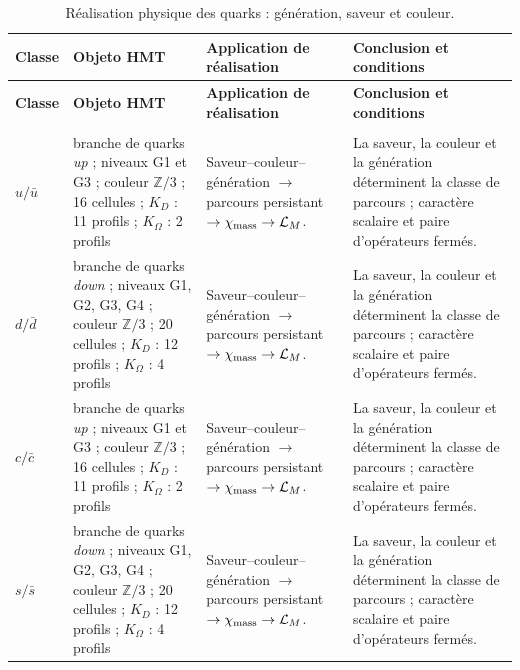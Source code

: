 \begingroup
\setlength{\tabcolsep}{4.5pt}
\renewcommand{\arraystretch}{1.28}
\begin{longtable}{@{}>{\raggedright\arraybackslash}p{}>{\raggedright\arraybackslash}p{}>{\raggedright\arraybackslash}p{}>{\raggedright\arraybackslash}p{}@{}}
\caption{Réalisation physique des quarks : génération, saveur et couleur.}\label{tab:masas-realizacion-quarks}\\
\toprule
\textbf{Classe} & \textbf{Objeto HMT} & \textbf{Application de réalisation} & \textbf{Conclusion et conditions} \\
\midrule
\endfirsthead
\toprule
\textbf{Classe} & \textbf{Objeto HMT} & \textbf{Application de réalisation} & \textbf{Conclusion et conditions} \\
\midrule
\endhead
\midrule
\multicolumn{4}{r}{\footnotesize Suite à la page suivante.}\\
\endfoot
\bottomrule
\endlastfoot
$u/\bar u$ & branche de quarks \emph{up} ; niveaux G1 et G3 ; couleur $\mathbb Z/3$ ; 16 cellules ; $K_D$ : 11 profils ; $K_\Omega$ : 2 profils & Saveur--couleur--génération $\to$ parcours persistant $\to\chi_{\rm mass}\to\mathcal L_M$. & La saveur, la couleur et la génération déterminent la classe de parcours ; caractère scalaire et paire d’opérateurs fermés. \\
$d/\bar d$ & branche de quarks \emph{down} ; niveaux G1, G2, G3, G4 ; couleur $\mathbb Z/3$ ; 20 cellules ; $K_D$ : 12 profils ; $K_\Omega$ : 4 profils & Saveur--couleur--génération $\to$ parcours persistant $\to\chi_{\rm mass}\to\mathcal L_M$. & La saveur, la couleur et la génération déterminent la classe de parcours ; caractère scalaire et paire d’opérateurs fermés. \\
$c/\bar c$ & branche de quarks \emph{up} ; niveaux G1 et G3 ; couleur $\mathbb Z/3$ ; 16 cellules ; $K_D$ : 11 profils ; $K_\Omega$ : 2 profils & Saveur--couleur--génération $\to$ parcours persistant $\to\chi_{\rm mass}\to\mathcal L_M$. & La saveur, la couleur et la génération déterminent la classe de parcours ; caractère scalaire et paire d’opérateurs fermés. \\
$s/\bar s$ & branche de quarks \emph{down} ; niveaux G1, G2, G3, G4 ; couleur $\mathbb Z/3$ ; 20 cellules ; $K_D$ : 12 profils ; $K_\Omega$ : 4 profils & Saveur--couleur--génération $\to$ parcours persistant $\to\chi_{\rm mass}\to\mathcal L_M$. & La saveur, la couleur et la génération déterminent la classe de parcours ; caractère scalaire et paire d’opérateurs fermés. \\

\end{longtable}
